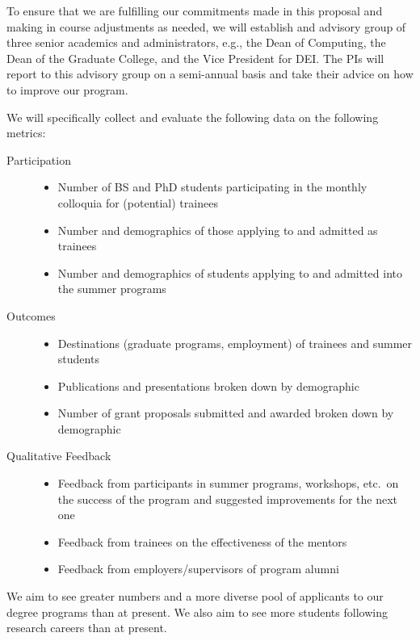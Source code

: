 \documentclass[11pt]{NSFamsart}
\begin{document}
To ensure that we are fulfilling our commitments made in this proposal and making in course adjustments as needed, we will establish and advisory group of three senior academics and administrators, e.g., the Dean of Computing, the Dean of the Graduate College, and the Vice President for DEI.  The PIs will report to this advisory group on a semi-annual basis and take their advice on how to improve our program.

We will specifically collect and evaluate the following data on the following metrics:

\begin{description}
	\item[Participation] \phantom{a}
	\begin{itemize}
		\item Number of BS and PhD students participating in the monthly colloquia for (potential) trainees
		\item Number and demographics of those applying to and admitted as trainees
		\item Number and demographics of students applying to and admitted into the summer programs
	\end{itemize}
	\item[Outcomes] \phantom{a}
	\begin{itemize}
		\item Destinations (graduate programs, employment) of trainees and summer students
		\item Publications and presentations broken down by demographic
		\item Number of grant proposals submitted and awarded broken down by demographic
	\end{itemize}
	\item[Qualitative Feedback] \phantom{a}
\begin{itemize}
\item Feedback from participants in summer programs, workshops, etc.\ on the success of the program and suggested improvements for the next one
\item Feedback from trainees on the effectiveness of the mentors
\item Feedback from employers/supervisors of program alumni
\end{itemize}
\end{description}
We aim to see greater numbers and a more diverse pool of  applicants to our degree programs than at present.  We also aim to see more students following research careers than at present.  
 
\end{document}
